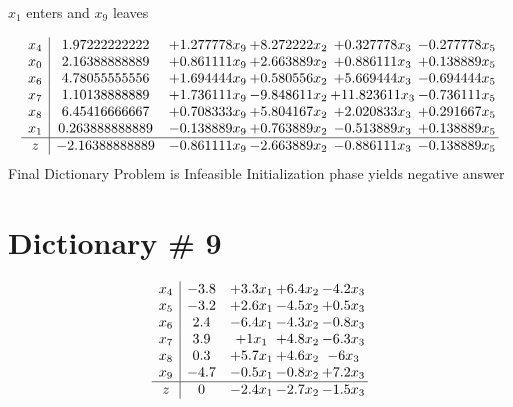\documentclass[12pt]{article}
\begin{document}
 $ x_{1} $ enters and $ x_{9} $ leaves 

 \[\begin{array}{c| c c@{\hskip 2pt} c@{\hskip 2pt} c@{\hskip 2pt} c@{\hskip 2pt} }
 x_{4}   &  1.97222222222 & + 1.277778 x_{9} & + 8.272222 x_{2} & + 0.327778 x_{3} & -0.277778 x_{5}\\
 x_{0}   &  2.16388888889 & + 0.861111 x_{9} & + 2.663889 x_{2} & + 0.886111 x_{3} & + 0.138889 x_{5}\\
 x_{6}   &  4.78055555556 & + 1.694444 x_{9} & + 0.580556 x_{2} & + 5.669444 x_{3} & -0.694444 x_{5}\\
 x_{7}   &  1.10138888889 & + 1.736111 x_{9} & -9.848611 x_{2} & + 11.823611 x_{3} & -0.736111 x_{5}\\
 x_{8}   &  6.45416666667 & + 0.708333 x_{9} & + 5.804167 x_{2} & + 2.020833 x_{3} & + 0.291667 x_{5}\\
 x_{1}   &  0.263888888889 & -0.138889 x_{9} & + 0.763889 x_{2} & -0.513889 x_{3} & + 0.138889 x_{5}\\
\hline
z    &  -2.16388888889 & -0.861111 x_{9} & -2.663889 x_{2} & -0.886111 x_{3} & -0.138889 x_{5}\\
\end{array}\]
Final Dictionary
Problem is Infeasible Initialization phase yields negative answer 

\section{Dictionary \# 9}
\[\begin{array}{c| c c@{\hskip 2pt} c@{\hskip 2pt} c@{\hskip 2pt} }
 x_{4}   &  -3.8 & + 3.3 x_{1} & + 6.4 x_{2} & -4.2 x_{3}\\
 x_{5}   &  -3.2 & + 2.6 x_{1} & -4.5 x_{2} & + 0.5 x_{3}\\
 x_{6}   &  2.4 & -6.4 x_{1} & -4.3 x_{2} & -0.8 x_{3}\\
 x_{7}   &  3.9 & + 1 x_{1} & + 4.8 x_{2} & -6.3 x_{3}\\
 x_{8}   &  0.3 & + 5.7 x_{1} & + 4.6 x_{2} & -6 x_{3}\\
 x_{9}   &  -4.7 & -0.5 x_{1} & -0.8 x_{2} & + 7.2 x_{3}\\
\hline
z    &  0 & -2.4 x_{1} & -2.7 x_{2} & -1.5 x_{3}\\
\end{array}\]
\end{document}
